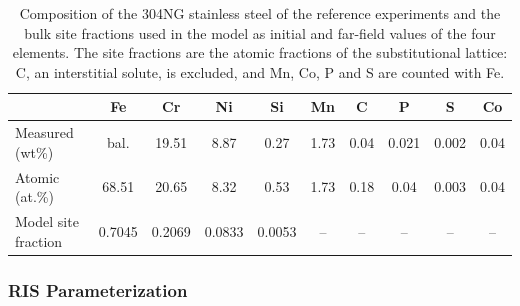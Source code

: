 \documentclass[3p,times,nonatbib]{elsarticle} %
\begin{document}
\begin{table}[htbp]
\centering
\caption{Composition of the 304NG stainless steel of the reference experiments
\cite{deng2017effect} and the bulk site fractions used in the model as
initial and far-field values of the four elements. The site fractions are the
atomic fractions of the substitutional lattice: C, an interstitial solute, is
excluded, and Mn, Co, P and S are counted with Fe.}
\label{tab:composition}
\footnotesize
\setlength{\tabcolsep}{4pt}
\begin{tabular}{@{}lccccccccc@{}}
\hline
 & Fe & Cr & Ni & Si & Mn & C & P & S & Co \\
\hline
Measured (wt\%) & bal. & 19.51 & 8.87 & 0.27 & 1.73 & 0.04 & 0.021 & 0.002 & 0.04 \\
Atomic (at.\%) & 68.51 & 20.65 & 8.32 & 0.53 & 1.73 & 0.18 & 0.04 & 0.003 & 0.04 \\
Model site fraction & 0.7045 & 0.2069 & 0.0833 & 0.0053 & -- & -- & -- & -- & -- \\
\hline
\end{tabular}
\end{table}


\subsubsection{RIS Parameterization}
\label{sec:methodRISCalibration}
\end{document}
